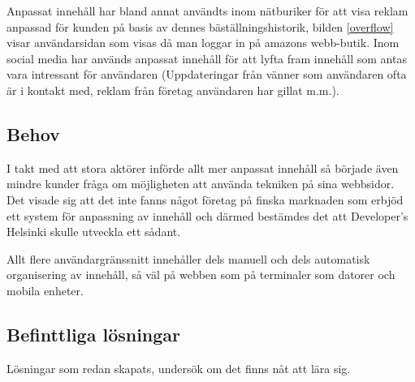Anpassat innehåll har bland annat användts inom nätburiker för att visa reklam anpassad för kunden på basis av dennes bäställningshistorik, bilden \ref{overflow} visar användarsidan som visas då man loggar in på amazons webb-butik. Inom social media har används anpassat innehåll för att lyfta fram innehåll som antas vara intressant för användaren (Uppdateringar från vänner som användaren ofta är i kontakt med, reklam från företag användaren har gillat m.m.).


\subsection{Behov}

I takt med att stora aktörer införde allt mer anpassat innehåll så började även mindre kunder fråga om möjligheten att använda tekniken på sina webbsidor. Det visade sig att det inte fanns något företag på finska marknaden som erbjöd ett system för anpassning av innehåll och därmed bestämdes det att Developer's Helsinki skulle utveckla ett sådant.

Allt flere användargränssnitt innehåller dels manuell och dels automatisk organisering av innehåll, så väl på webben som på terminaler som datorer och mobila enheter.

\subsection{Befinttliga lösningar}

Lösningar som redan skapats, undersök om det finns nåt att lära sig.




